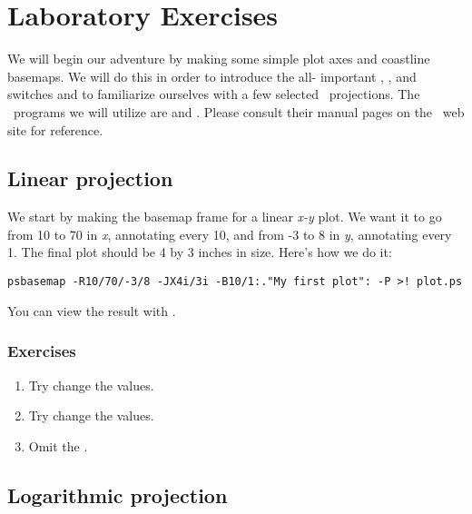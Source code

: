 \documentclass{report}
\begin{document}
\section{Laboratory Exercises}

We will begin our adventure by making some simple plot axes and
coastline basemaps.  We will do this in order to introduce the all-%
important , , and  switches and to familiarize
ourselves with a few selected \GMT\ projections.  The \GMT\ programs
we will utilize are  and .  Please
consult their manual pages on the \GMT\ web site for reference.

\subsection{Linear projection}

We start by making the basemap frame for a linear {\it x-y} plot.
We want it to go from 10 to 70 in {\it x}, annotating every 10, and
from -3 to 8 in {\it y}, annotating every 1.  The final plot should be
4 by 3 inches in size.  Here's how we do it:

\begin{verbatim}
psbasemap -R10/70/-3/8 -JX4i/3i -B10/1:."My first plot": -P >! plot.ps
\end{verbatim}

\noindent
You can view the result with  .

\subsubsection{Exercises}

\begin{enumerate}

\item Try change the  values.

\item Try change the  values.

\item Omit the .

\end{enumerate}

\subsection{Logarithmic projection}
\end{document}
